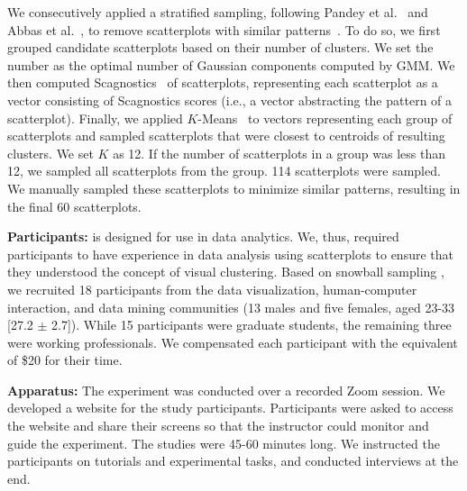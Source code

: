 We consecutively applied a stratified sampling, following Pandey et al.~\cite{pandey2016towards} and Abbas et al.~\cite{abbas19cgf}, to 
remove scatterplots with similar patterns~\cite{abbas19cgf}.  
To do so, we first grouped candidate scatterplots based on their number of clusters. We set the number as the optimal number of Gaussian components computed by GMM. We then computed Scagnostics~\cite{dang2014transforming} of scatterplots, representing each scatterplot as a vector consisting of Scagnostics scores (i.e., a vector abstracting the pattern of a scatterplot). Finally, we applied $K$-Means~\cite{likas03pr} to vectors representing each group of scatterplots and sampled scatterplots that were closest to centroids of resulting clusters. We 
set $K$ as 12. If the number of scatterplots in a group was less than 12, we sampled all scatterplots from the group.  
114 scatterplots were sampled. 
We manually sampled these scatterplots to minimize similar patterns, resulting in the final 60 scatterplots. 


\noindent
\textbf{Participants:} 
\measure is designed for use in data analytics. We, thus, required participants to have experience in data analysis using scatterplots to ensure that they understood the concept of visual clustering. Based on snowball sampling \cite{goodman61ams}, we recruited 18 participants from the data visualization, human-computer interaction, and data mining communities (13 males and five females, aged 23-33 [27.2 $\pm$ 2.7]).
While 15 participants were graduate students, the remaining three were working professionals.
We compensated each participant with the equivalent of \$20 for their time. 


\noindent
\textbf{Apparatus:}
The experiment was conducted over a recorded Zoom session.
We developed a website for the study participants.
Participants were asked to access the website and share their screens so that the instructor could monitor and guide the experiment. 
The studies were 45-60 minutes long. We instructed the participants on tutorials and experimental tasks, and conducted interviews at the end. 



